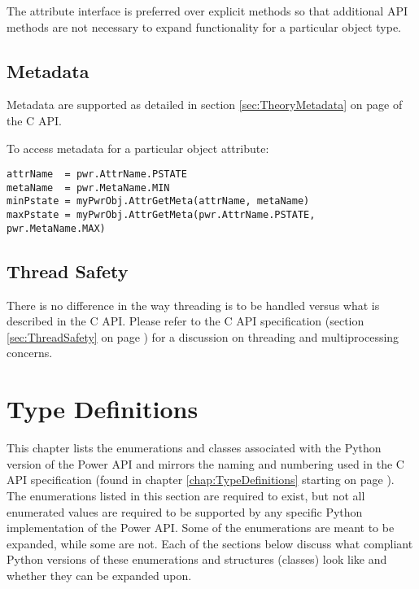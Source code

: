 \documentclass[12pt]{report} %
\begin{document}
\begin{appendices}
The attribute interface is preferred over explicit methods so that additional
API methods are not necessary to expand functionality for a particular
object type.

\subsection{Metadata}\label{sec:PythonMetadata}
Metadata are supported as detailed in section \ref{sec:TheoryMetadata} on page
\pageref{sec:TheoryMetadata} of the C API.

To access metadata for a particular object attribute:

\begin{center}\begin{minipage}{.95\linewidth}\begin{lstlisting}
attrName  = pwr.AttrName.PSTATE
metaName  = pwr.MetaName.MIN
minPstate = myPwrObj.AttrGetMeta(attrName, metaName)
maxPstate = myPwrObj.AttrGetMeta(pwr.AttrName.PSTATE, pwr.MetaName.MAX)
\end{lstlisting}\end{minipage}\end{center}

\subsection{Thread Safety}\label{sec:PythonThreadSafety}

There is no difference in the way threading is to be handled versus what is described
in the C API.
Please refer to the C API specification (section \ref{sec:ThreadSafety} on
page \pageref{sec:ThreadSafety}) for a discussion on threading and
multiprocessing concerns.

\section{Type Definitions}\label{sec:PythonTypeDefinitions}

This chapter lists the enumerations and classes associated with the Python
version of the Power API and mirrors the naming and numbering used in the C
API specification (found in chapter \ref{chap:TypeDefinitions} starting on page
\pageref{chap:TypeDefinitions}). The enumerations listed in this section are
required to exist, but not all enumerated values are required to be supported
by any specific Python implementation of the Power API. Some of the
enumerations are meant to be expanded, while some are not. Each of the sections
below discuss what compliant Python versions of these enumerations and
structures (classes) look like and whether they can be expanded upon. 


\end{appendices}
\end{document}
